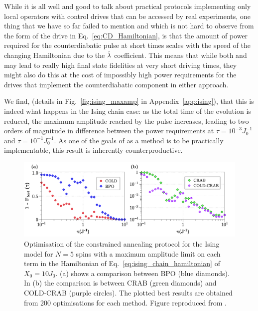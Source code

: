 While it is all well and good to talk about practical protocols implementing only local  operators with control drives that can be accessed by real experiments, one thing that we have so far failed to mention and which is not hard to observe from the form of the  drive in Eq.~\ref{eq:CD_Hamiltonian}, is that the amount of power required for the counterdiabatic pulse at short times scales with the speed of the changing Hamiltonian due to the $\dot{\lambda}$ coefficient. This means that while both  and  may lead to really high final state fidelities at very short driving times, they might also do this at the cost of impossibly high power requirements for the drives that implement the counterdiabatic component in either approach.

We find, (details in Fig.~\ref{fig:ising_maxamp} in Appendix~\ref{app:ising}), that this is indeed what happens in the Ising chain case: as the total time of the evolution is reduced, the maximum amplitude reached by the  pulse increases, leading to two orders of magnitude in difference between the power requirements at $\tau = 10^{-3}J_0^{-1}$ and $\tau = 10^{-1}J_0^{-1}$. As one of the goals of  as a method is to be practically implementable, this result is inherently counterproductive.

\begin{figure}[t]
    \centering
    \includegraphics[width=\linewidth]{images_v1/IsingcConstrained.png} \caption[Applying COLD and COLD-CRAB to the Ising chain for 5 spins with constrained driving amplitudes.]{Optimisation of the constrained annealing protocol for the Ising model for $N=5$ spins with a maximum amplitude limit on each term in the Hamiltonian of Eq.~\eqref{eq:ising_chain_hamiltonian} of $X_0 = 10J_0$. (a) shows a comparison between BPO (blue diamonds). In (b) the comparison is between CRAB (green diamonds) and COLD-CRAB (purple circles). The plotted best results are obtained from 200 optimisations for each method. Figure reproduced from \cite{cepaite_cold_2023}.}\label{fig:ising_constrained}
\end{figure}

